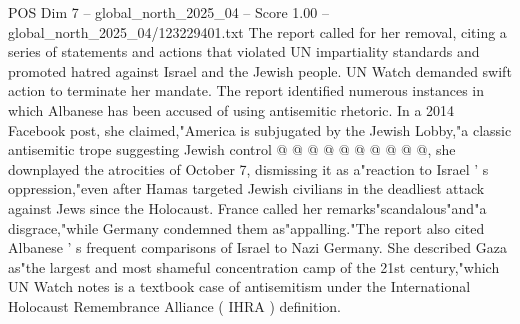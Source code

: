 \begin{textsample}{POS Dim 7 – global\_north\_2025\_04 – Score 1.00 – global\_north\_2025\_04/123229401.txt}
The report called for her removal, citing a series of statements and actions that violated UN impartiality standards and promoted hatred against Israel and the Jewish people.
UN Watch demanded swift action to terminate her mandate.
The report identified numerous instances in which Albanese has been accused of using antisemitic rhetoric.
In a 2014 Facebook post, she claimed,"America is subjugated by the Jewish Lobby,"a classic antisemitic trope suggesting Jewish control @ @ @ @ @ @ @ @ @ @, she downplayed the atrocities of October 7, dismissing it as a"reaction to Israel ' s oppression,"even after Hamas targeted Jewish civilians in the deadliest attack against Jews since the Holocaust.
France called her remarks"scandalous"and"a disgrace,"while Germany condemned them as"appalling."The report also cited Albanese ' s frequent comparisons of Israel to Nazi Germany.
She described Gaza as"the largest and most shameful concentration camp of the 21st century,"which UN Watch notes is a textbook case of antisemitism under the International Holocaust Remembrance Alliance ( IHRA ) definition.

\end{textsample}

